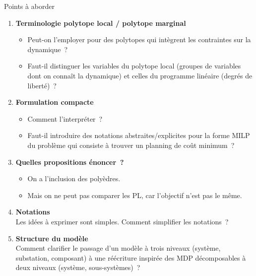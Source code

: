 \documentclass[aspectratio=169,10pt]{beamer}
\begin{document}
\begin{frame}{Points à aborder}
\vspace{-0.5em}
\small
\begin{enumerate}
  \setlength{\itemsep}{0.2em}
  \item \textbf{Terminologie polytope local / polytope marginal}
  \begin{itemize}
    \item Peut-on l'employer pour des polytopes qui intègrent les contraintes sur la dynamique~?
    \item Faut-il distinguer les variables du polytope local (groupes de variables dont on connaît la dynamique)
          et celles du programme linéaire (degrés de liberté)~?
  \end{itemize}
  \item \textbf{Formulation compacte}
  \begin{itemize}
    \item Comment l'interpréter~?
    \item Faut-il introduire des notations abstraites/explicites pour la forme MILP du problème
          qui consiste à trouver un planning de coût minimum~?
  \end{itemize}
  \item \textbf{Quelles propositions énoncer~?}
  \begin{itemize}
    \item On a l'inclusion des polyèdres.
    \item Mais on ne peut pas comparer les PL, car l'objectif n'est pas le même.
  \end{itemize}
  \item \textbf{Notations} \\
        Les idées à exprimer sont simples. Comment simplifier les notations~?
  \item \textbf{Structure du modèle} \\
        Comment clarifier le passage d'un modèle à trois niveaux (système, substation, composant)
        à une réécriture inspirée des MDP décomposables à deux niveaux (système, sous-systèmes)~?
\end{enumerate}
\end{frame}
\end{document}

